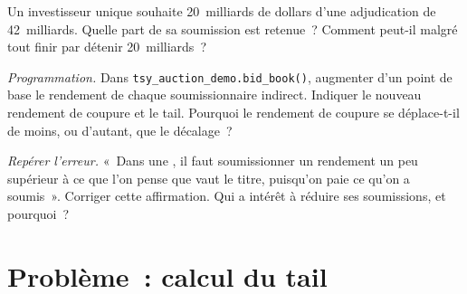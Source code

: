 \begin{exercise}[$\star\star$]\label{exo:m2:the-treasury-market:6}
Un investisseur unique souhaite 20~milliards de dollars d'une adjudication de 42~milliards. Quelle part
de sa soumission est retenue~? Comment peut-il malgré tout finir par détenir 20~milliards~?
\end{exercise}

\begin{exercise}[$\star\star\star$]\label{exo:m2:the-treasury-market:7}
\emph{Programmation.} Dans \texttt{tsy\_auction\_demo.bid\_book()}, augmenter d'un point de base le
rendement de chaque soumissionnaire indirect. Indiquer le nouveau rendement de coupure et le tail. Pourquoi
le rendement de coupure se déplace-t-il de moins, ou d'autant, que le décalage~?
\end{exercise}

\begin{exercise}[$\star\star\star$]\label{exo:m2:the-treasury-market:8}
\emph{Repérer l'erreur.} «~Dans une , il faut soumissionner un rendement
un peu supérieur à ce que l'on pense que vaut le titre, puisqu'on paie ce qu'on a soumis~». Corriger
cette affirmation. Qui a intérêt à réduire ses soumissions, et pourquoi~?
\end{exercise}

\section{Problème~: calcul du tail}

